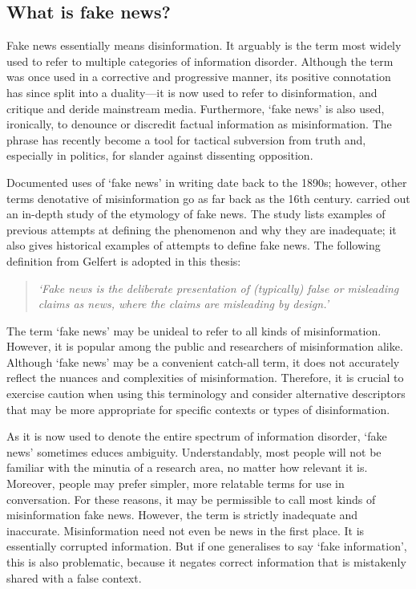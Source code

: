 \subsection{What is fake news?}
\label{ssec:fake-news}

Fake news essentially means disinformation. It arguably is the term most widely used to refer to multiple categories of information disorder. Although the term was once used in a corrective and progressive manner, its positive connotation has since split into a duality—it is now used to refer to disinformation, and critique and deride mainstream media. Furthermore, `fake news' is also used, ironically, to denounce or discredit factual information as misinformation. The phrase has recently become a tool for tactical subversion from truth and, especially in politics, for slander against dissenting opposition.

Documented uses of `fake news' in writing date back to the 1890s; however, other terms denotative of misinformation go as far back as the 16th century.  carried out an in-depth study of the etymology of fake news. The study lists examples of previous attempts at defining the phenomenon and why they are inadequate; it also gives historical examples of attempts to define fake news. The following definition from Gelfert is adopted in this thesis:

\begin{quote}
  \begin{Center}
  \emph{`Fake news is the deliberate presentation of (typically) false or misleading claims as news, where the claims are misleading by design.'}
  \end{Center}
\end{quote}

The term `fake news' may be unideal to refer to all kinds of misinformation. However, it is popular among the public and researchers of misinformation alike. Although `fake news' may be a convenient catch-all term, it does not accurately reflect the nuances and complexities of misinformation. Therefore, it is crucial to exercise caution when using this terminology and consider alternative descriptors that may be more appropriate for specific contexts or types of disinformation.

As it is now used to denote the entire spectrum of information disorder, `fake news' sometimes educes ambiguity. Understandably, most people will not be familiar with the minutia of a research area, no matter how relevant it is. Moreover, people may prefer simpler, more relatable terms for use in conversation. For these reasons, it may be permissible to call most kinds of misinformation fake news. However, the term is strictly inadequate and inaccurate. Misinformation need not even be news in the first place. It is essentially corrupted information. But if one generalises to say `fake information', this is also problematic, because it negates correct information that is mistakenly shared with a false context.

